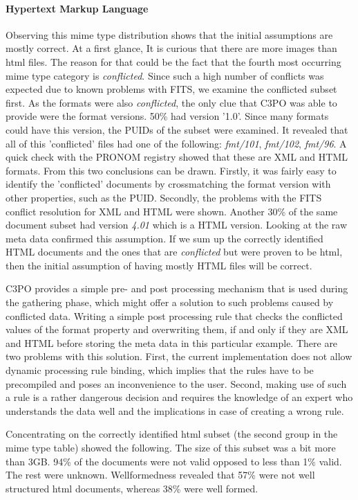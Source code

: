 \paragraph{Hypertext Markup Language}
Observing this mime type distribution shows that the initial assumptions are mostly correct. At a first glance, It is curious that there are more images than html files. The reason for that could be the fact that the fourth most occurring mime type category is \textit{conflicted}. Since such a high number of conflicts was expected due to known problems with FITS, we examine the conflicted subset first. As the formats were also \textit{conflicted}, the only clue that C3PO was able to provide were the format versions. 50\% had version '1.0'. Since many formats could have this version, the PUIDs of the subset were examined. It revealed that all of this 'conflicted' files had one of the following: \textit{fmt/101}, \textit{fmt/102}, \textit{fmt/96}. A quick check with the PRONOM registry showed that these are XML and HTML formats. From this two conclusions can be drawn. Firstly, it was fairly easy to identify the 'conflicted' documents by crossmatching the format version with other properties, such as the PUID. Secondly, the problems with the FITS conflict resolution for XML and HTML were shown. Another 30\% of the same document subset had version \textit{4.01} which is a HTML version. Looking at the raw meta data confirmed this assumption. If we sum up the correctly identified HTML documents and the ones that are \textit{conflicted} but were proven to be html, then the initial assumption of having mostly HTML files will be correct.

C3PO provides a simple pre- and post processing mechanism that is used during the gathering phase, which might offer a solution to such problems caused by conflicted data. Writing a simple post processing rule that checks the conflicted values of the format property and overwriting them, if and only if they are XML and HTML before storing the meta data in this particular example. There are two problems with this solution. First, the current implementation does not allow dynamic processing rule binding, which implies that the rules have to be precompiled and poses an inconvenience to the user. Second, making use of such a rule is a rather dangerous decision and requires the knowledge of an expert who understands the data well and the implications in case of creating a wrong rule.

Concentrating on the correctly identified html subset (the second group in the mime type table) showed the following.
The size of this subset was a bit more than 3GB. 94\% of the documents were not valid opposed to less than 1\% valid. The rest were unknown. Wellformedness revealed that 57\% were not well structured html documents, whereas 38\% were well formed.

